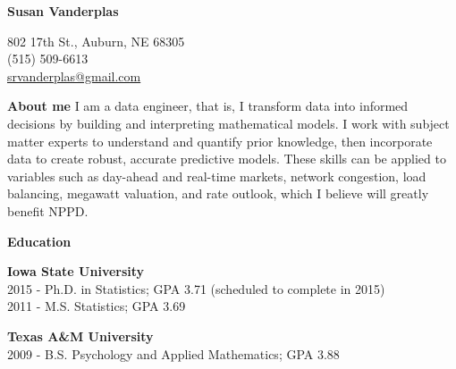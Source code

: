 \documentclass[letterpaper,12pt,final]{memoir}
\newcommand{\MedSep}{\vspace{1em}}
\newcommand{\SmallSep}{\vspace{0.5em}}
\newenvironment{AboutMe}
	{\ignorespaces\textbf{\color{RoyalBlue} About me}}
	{\MedSep\ignorespacesafterend}
\newcommand{\CVSection}[1]
	{\Large\textbf{#1}\par
	\SmallSep\normalsize\normalfont}
\newcommand{\CVItem}[1]
	{\textbf{\color{RoyalBlue} #1}}
\begin{document}



\begin{minipage}[t]{.6\linewidth}
\Huge\bfseries {\color{RoyalBlue} Susan Vanderplas} \\
\end{minipage}\hfill
\begin{minipage}[t]{.35\linewidth}
\begin{flushright}\small
\phantom{\Huge SVP}
802 17th St., Auburn, NE 68305 \\
(515) 509-6613\\
\url{srvanderplas@gmail.com} 
\end{flushright}
\end{minipage}

\normalsize\normalfont
\SmallSep
\begin{AboutMe}
I am a data engineer, that is, I transform data into informed decisions by building and interpreting mathematical models. 
I work with subject matter experts to understand and quantify prior knowledge, then incorporate data to create robust, accurate predictive models. 
These skills can be applied to variables such as day-ahead and real-time markets, network congestion, load balancing, megawatt valuation, and rate outlook, which I believe will greatly benefit NPPD.\vspace{-6pt}
\end{AboutMe}

\CVSection{Education}
\CVItem{Iowa State University}\\
2015 - Ph.D. in Statistics; GPA 3.71 (scheduled to complete in 2015)\\
2011 - M.S. Statistics; GPA 3.69
\SmallSep

\CVItem{Texas A\&M University}\\
2009 - B.S. Psychology and Applied Mathematics; GPA 3.88
\MedSep
\end{document}
